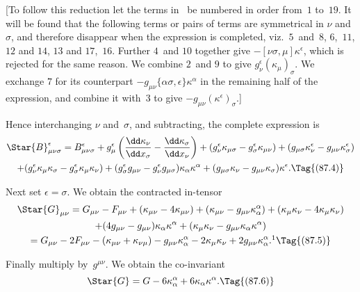 \documentclass[12pt]{book}
\begin{document}
[To follow this reduction let the terms in~ be numbered in order
from~$1$ to~$19$. It will be found that the following terms or pairs of terms are
symmetrical in $\nu$ and~$\sigma$, and therefore disappear when the expression is
completed, viz.\ $5$~and~$8$, $6$,~$11$, $12$ and $14$, $13$ and $17$,~$16$. Further $4$~and $10$
together give $-[\nu\sigma, \mu] \kappa^{\epsilon}$, which is rejected for the same reason. We combine
$2$~and $9$ to give $g_{\nu}^{\epsilon} (\kappa_{\mu})_{\sigma}$. We exchange $7$ for its counterpart $-g_{\mu\nu} \{\alpha\sigma, \epsilon\} \kappa^{\alpha}$
in the remaining half of the expression, and combine it with~$3$ to give
$-g_{\mu\nu} (\kappa^{\epsilon})_{\sigma}$.]

Hence interchanging $\nu$ and~$\sigma$, and subtracting, the complete expression is
\begin{multline*}
  \Star{B}_{\mu\nu\sigma}^{\epsilon}
  = B_{\mu\nu\sigma}^{\epsilon} + g_{\mu}^{\epsilon} \left(\frac{\dd\kappa_{\nu}}{\dd x_{\sigma}} - \frac{\dd\kappa_{\sigma}}{\dd x_{\nu}}\right)
  + (g_{\nu}^{\epsilon} \kappa_{\mu\sigma} - g_{\sigma}^{\epsilon} \kappa_{\mu\nu})
  + (g_{\mu\sigma} \kappa_{\nu}^{\epsilon} - g_{\mu\nu} \kappa_{\sigma}^{\epsilon}) \\
  + (g_{\nu}^{\epsilon} \kappa_{\mu} \kappa_{\sigma} - g_{\sigma}^{\epsilon} \kappa_{\mu} \kappa_{\nu})
  + (g_{\sigma}^{\epsilon} g_{\mu\nu} - g_{\nu}^{\epsilon} g_{\mu\sigma}) \kappa_{\alpha} \kappa^{\alpha}
  + (g_{\mu\sigma} \kappa_{\nu} - g_{\mu\nu} \kappa_{\sigma}) \kappa^{\epsilon}.
  \Tag{(87.4)}
\end{multline*}

Next set $\epsilon = \sigma$. We obtain the contracted in-tensor
\begin{multline*}
  \Star{G}_{\mu\nu} = G_{\mu\nu} - F_{\mu\nu}
  + (\kappa_{\mu\nu} - 4\kappa_{\mu\nu})
  + (\kappa_{\mu\nu} - g_{\mu\nu} \kappa_{\alpha}^{\alpha})
  + (\kappa_{\mu} \kappa_{\nu} - 4\kappa_{\mu} \kappa_{\nu}) \\
  + (4g_{\mu\nu} - g_{\mu\nu}) \kappa_{\alpha} \kappa^{\alpha}
  + (\kappa_{\mu} \kappa_{\nu} - g_{\mu\nu} \kappa_{\alpha} \kappa^{\alpha}) \\
  = G_{\mu\nu} - 2F_{\mu\nu} - (\kappa_{\mu\nu} + \kappa_{\nu\mu})
  - g_{\mu\nu} \kappa_{\alpha}^{\alpha}
  - 2\kappa_{\mu} \kappa_{\nu}
  + 2g_{\mu\nu} \kappa_{\alpha}^{\alpha}.\footnotemark
  \Tag{(87.5)}
\end{multline*}

Finally multiply by~$g^{\mu\nu}$. We obtain the co-invariant
%
\[
\Star{G} = G - 6\kappa_{\alpha}^{\alpha} + 6\kappa_{\alpha} \kappa^{\alpha}.
\Tag{(87.6)}
\]
\end{document}
